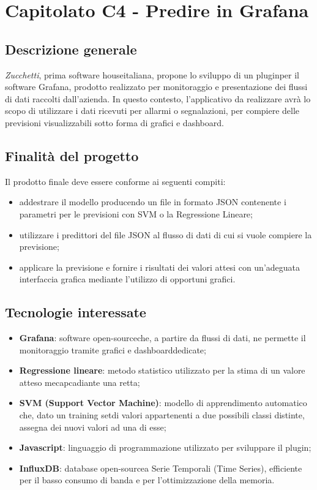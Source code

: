 \section{Capitolato C4 - Predire in Grafana}

\subsection{Descrizione generale}
\textit{Zucchetti}, prima software house\glo italiana, propone lo sviluppo di un plugin\glo per il software Grafana, prodotto realizzato per monitoraggio e presentazione dei flussi di dati raccolti dall'azienda. In questo contesto, l'applicativo da realizzare avrà lo scopo di utilizzare i dati ricevuti per allarmi o segnalazioni, per compiere delle previsioni visualizzabili sotto forma di grafici e dashboard\glo.

\subsection{Finalità del progetto}
Il prodotto finale deve essere conforme ai seguenti compiti:
\begin{itemize}
	\item addestrare il modello producendo un file in formato JSON contenente i parametri per le previsioni con SVM o la Regressione Lineare;
	\item utilizzare i predittori del file JSON al flusso di dati di cui si vuole compiere la previsione;
	\item applicare la previsione e fornire i risultati dei valori attesi con un'adeguata interfaccia grafica mediante l'utilizzo di opportuni grafici.
\end{itemize}

\subsection{Tecnologie interessate}
\begin{itemize}
	\item \textbf{Grafana}: software open-source\glo che, a partire da flussi di dati, ne permette il monitoraggio tramite grafici e dashboard\glo dedicate;
	\item \textbf{Regressione lineare}: metodo statistico utilizzato per la stima di un valore atteso mecapcadiante una retta;
	\item \textbf{SVM (Support Vector Machine)}:  modello di apprendimento automatico che, dato un training set\glo di valori appartenenti a due possibili classi distinte, assegna dei nuovi valori ad una di esse;
	\item \textbf{Javascript}: linguaggio di programmazione utilizzato per sviluppare il plugin\glo;
	\item \textbf{InfluxDB}: database open-source\glo a Serie Temporali (Time Series\glo), efficiente per il basso consumo di banda e per l'ottimizzazione della memoria.
\end{itemize}

